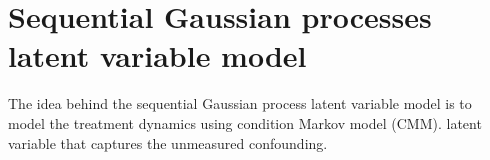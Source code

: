 \section{Sequential Gaussian processes latent variable model}
\label{sec:seqgplvm}
The idea behind the sequential Gaussian process latent variable model is to 
model the treatment dynamics using condition Markov model (CMM). latent variable
that captures the unmeasured confounding. 